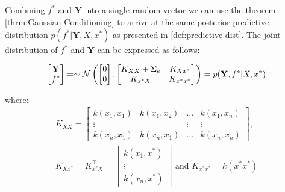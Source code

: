 
%


Combining $f^{\ast}$ and $\mathbf{Y}$ into a single random vector we can use the theorem \ref{thrm:Gaussian-Conditioning}
to arrive at the same posterior predictive distribution
$p(f^{\ast} | \mathbf{Y}, X, x^{\ast})$ as presented in \ref{def:predictive-dist}.
The joint distribution of $f^{\ast}$ and $\mathbf{Y}$ can be expressed as follows:

\begin{gather}
    \begin{bmatrix}
        \mathbf{Y} \\
        f^{\ast}
    \end{bmatrix} =
    \sim \operatorname{\mathcal{N}} \left(
        \begin{bmatrix}
        0 \\
        0
        \end{bmatrix},
        \begin{bmatrix}
        K_{XX} + \Sigma_e & K_{Xx^{\ast}} \\
        K_{x^{\ast}X} & K_{x^{\ast}x^{\ast}}
        \end{bmatrix}
        \right)
    = p(\mathbf{Y}, f^{\ast}| X, x^{\ast})
\end{gather}

where:
\begin{gather*}
    K_{XX} =
    \begin{bmatrix}
        k(x_1, x_1) & k(x_1, x_2) & \dots & k(x_1, x_n)\\
        \vdots  &  & \vdots  & \vdots \\
        k(x_n, x_1)  & k(x_n, x_1) & \dots  & k(x_n, x_n)
    \end{bmatrix}, \\
    K_{Xx^{\ast}} = K_{x^{\ast}X}^{\top} =
    \begin{bmatrix}
        k(x_1, x^{\ast}) \\
        \vdots \\
        k(x_n,  x^{\ast})
    \end{bmatrix} \text{ and }
    K_{x^{\ast}x^{\ast}} = k(x^{\ast}x^{\ast})
\end{gather*}

